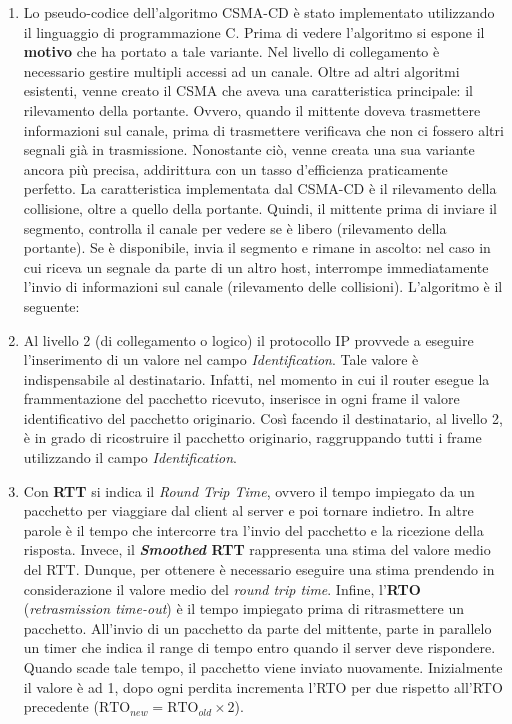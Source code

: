 \documentclass[a4paper]{article}
\begin{document}
	\begin{enumerate}
		\item Lo pseudo-codice dell'algoritmo CSMA-CD è stato implementato utilizzando il linguaggio di programmazione C. Prima di vedere l'algoritmo si espone il \textbf{motivo} che ha portato a tale variante. Nel livello di collegamento è necessario gestire multipli accessi ad un canale. Oltre ad altri algoritmi esistenti, venne creato il CSMA che aveva una caratteristica principale: il rilevamento della portante. Ovvero, quando il mittente doveva trasmettere informazioni sul canale, prima di trasmettere verificava che non ci fossero altri segnali già in trasmissione.\newline
		Nonostante ciò, venne creata una sua variante ancora più precisa, addirittura con un tasso d'efficienza praticamente perfetto. La caratteristica implementata dal CSMA-CD è il rilevamento della collisione, oltre a quello della portante. Quindi, il mittente prima di inviare il segmento, controlla il canale per vedere se è libero (rilevamento della portante). Se è disponibile, invia il segmento e rimane in ascolto: nel caso in cui riceva un segnale da parte di un altro host, interrompe immediatamente l'invio di informazioni sul canale (rilevamento delle collisioni).\newpage
		L'algoritmo è il seguente:
		
		
		\item Al livello 2 (di collegamento o logico) il protocollo IP provvede a eseguire l'inserimento di un valore nel campo \emph{Identification}. Tale valore è indispensabile al destinatario. Infatti, nel momento in cui il router esegue la frammentazione del pacchetto ricevuto, inserisce in ogni frame il valore identificativo del pacchetto originario.\newline
		Così facendo il destinatario, al livello 2, è in grado di ricostruire il pacchetto originario, raggruppando tutti i frame utilizzando il campo \emph{Identification}.\newpage
		
		\item Con \textbf{RTT} si indica il \emph{Round Trip Time}, ovvero il tempo impiegato da un pacchetto per viaggiare dal client al server e poi tornare indietro. In altre parole è il tempo che intercorre tra l'invio del pacchetto e la ricezione della risposta. Invece, il \textbf{\emph{Smoothed} RTT} rappresenta una stima del valore medio del RTT. Dunque, per ottenere è necessario eseguire una stima prendendo in considerazione il valore medio del \emph{round trip time}.\newline
		Infine, l'\textbf{RTO} (\emph{retrasmission time-out}) è il tempo impiegato prima di ritrasmettere un pacchetto. All'invio di un pacchetto da parte del mittente, parte in parallelo un timer che indica il range di tempo entro quando il server deve rispondere. Quando scade tale tempo, il pacchetto viene inviato nuovamente. Inizialmente il valore è ad 1, dopo ogni perdita incrementa l'RTO per due rispetto all'RTO precedente ($\mathrm{RTO}_{new} = \mathrm{RTO}_{old} \times 2$).
	\end{enumerate}
	
\end{document}
